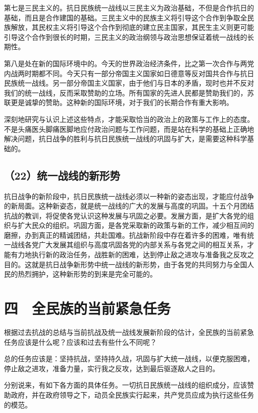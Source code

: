 第七是三民主义的。抗日民族统一战线以三民主义为政治基础，不但是合作抗日的基础，而且是合作建国的基础。三民主义中的民族主义将引导这个合作到争取全民族解放，其民权主义将引导这个合作到彻底的建立民主国家，其民生主义则更可能引导这个合作到很长的时期，三民主义的政治纲领与政治思想保证着统一战线的长期性。

第八是处在新的国际环境中的。今天的世界政治经济条件，比之第一次合作与两党内战两时期都不同。今天只有一部分帝国主义国家如日德意等反对国共合作与抗日民族统一战线。另一部分帝国主义国家，由于他们与日本的矛盾，现时也并不反对我们的统一战线，反而采取赞助的立场。所有国家的先进人民都是赞助我们的，苏联更是诚挚的赞助。这种新的国际环境，对于我们的长期合作有重大影响。

深刻地研究与认识上述这些特点，才能采取恰当的政治上的政策与工作上的态度。不是头痛医头脚痛医脚地应付政治问题与工作问题，而是站在科学的基础上正确地解决问题，抗日战争的胜利与抗日民族统一战线的巩固与扩大，是需要这种科学基础的。

\subsection{（22）统一战线的新形势}

抗日战争的新阶段中，抗日民族统一战线必须以一种新的姿态出现，才能应付战争的新局面。这种新姿态，就是统一战线的广大的发展与高度的巩固。十五个月团结抗战的教训，将促使各党认识这种发展与巩固之必要。发展方面，是扩大各党的组织与扩大民众的组织。巩固方面，是各党采取新的政策与新的工作，减少相互间的磨擦，办到真正的精诚团结，共赴国难。抗战新阶段中存在着许多的困难，唯有统一战线各党广大发展其组织与高度巩固各党的内部关系与各党之间的相互关系，才能有力地执行新的政治任务，战胜新的困难，达到停止敌之进攻与准备我之反攻之目的。这就是抗日战争新形势中统一战线的新形势，由于各党的共同努力与全国人民的热烈拥护，这种新形势的到来是完全可能的。

\section{四　全民族的当前紧急任务}

根据过去抗战的总结与当前抗战及统一战线发展新阶段的估计，全民族的当前紧急任务应该是什么呢？应该和过去有些什么不同呢？

总的任务应该是：坚持抗战，坚持持久战，巩固与扩大统一战线，以便克服困难，停止敌之进攻，准备力量，实行我之反攻，达到最后驱逐敌人之目的。

分别说来，有如下各方面的具体任务。一切抗日民族统一战线的组织成分，应该赞助政府，并在政府领导之下，动员全民族实行起来，共产党员应成为执行这些任务的模范。

